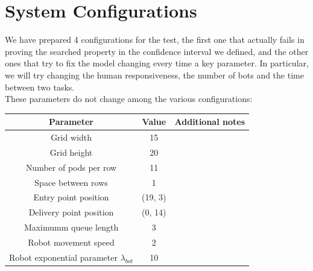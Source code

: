 \documentclass[10pt,a4paper]{article}
\begin{document}
	\section{System Configurations}
		We have prepared 4 configurations for the test, the first one that actually fails in proving the searched property in the confidence interval we defined, and the other ones that try to fix the model changing every time a key parameter. In particular, we will try changing the human responsiveness, the number of bots and the time between two tasks.\\
		These parameters do not change among the various configurations:
		\begin{center}
				\begin{tabular}{ |c|c|c|}
					\hline
					Parameter & Value & Additional notes\\
					\hline
					\hline
					Grid width & 15 &\\
					\hline
					Grid height & 20 &\\
					\hline
					Number of pods per row & 11 &\\
					\hline
					Space between rows & 1 &\\
					\hline
					Entry point position & (19, 3) &\\
					\hline
					Delivery point position & (0, 14) &\\
					\hline
					Maximumm queue length & 3 &\\
					\hline
					Robot movement speed & 2 &\\
					\hline
					Robot exponential parameter $\lambda_{bot}$ & 10 &\\
					\hline
				\end{tabular}
			\end{center}
\end{document}
